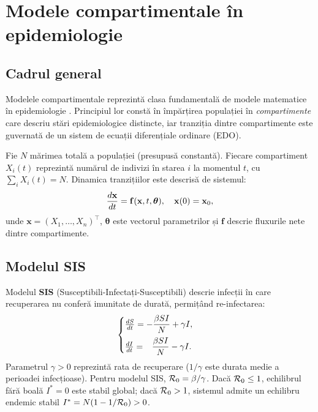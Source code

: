 \section{Modele compartimentale în epidemiologie}
\label{sec:modele_compartimentale}

\subsection{Cadrul general}
\label{subsec:cadru_general}

Modelele compartimentale reprezintă clasa fundamentală de modele matematice în
epidemiologie \cite{hethcote2000}. Principiul lor constă în împărțirea populației
în \emph{compartimente} care descriu stări epidemiologice distincte, iar tranziția
dintre compartimente este guvernată de un sistem de ecuații diferențiale ordinare
(EDO).

Fie $N$ mărimea totală a populației (presupusă constantă). Fiecare compartiment
$X_i(t)$ reprezintă numărul de indivizi în starea $i$ la momentul $t$, cu
$\sum_i X_i(t) = N$. Dinamic\-a tranzițiilor este descrisă de sistemul:
\begin{equation}
    \frac{d\mathbf{x}}{dt} = \mathbf{f}(\mathbf{x}, t, \boldsymbol{\theta}),
    \quad \mathbf{x}(0) = \mathbf{x}_0,
\end{equation}
unde $\mathbf{x} = (X_1, \ldots, X_n)^\intercal$, $\boldsymbol{\theta}$ este
vectorul parametrilor și $\mathbf{f}$ descrie fluxurile nete dintre compartimente.

\subsection{Modelul SIS}
\label{subsec:model_sis}

Modelul \textbf{SIS} (Susceptibili-Infectați-Susceptibili) descrie infecții în
care recuperarea nu conferă imunitate de durată, permițând re-infectarea:
\begin{equation}
\label{eq:sis}
\begin{cases}
    \frac{dS}{dt} = -\dfrac{\beta S I}{N} + \gamma I, \\[8pt]
    \frac{dI}{dt} = \phantom{-}\dfrac{\beta S I}{N} - \gamma I.
\end{cases}
\end{equation}
Parametrul $\gamma > 0$ reprezintă rata de recuperare ($1/\gamma$ este durata
medie a perioadei infecțioase). Pentru modelul SIS, $\mathcal{R}_0 = \beta/\gamma$.
Dacă $\mathcal{R}_0 \leq 1$, echilibrul fără boală $I^* = 0$ este stabil global; dacă
$\mathcal{R}_0 > 1$, sistemul admite un echilibru endemic stabil
$I^* = N(1 - 1/\mathcal{R}_0) > 0$.

